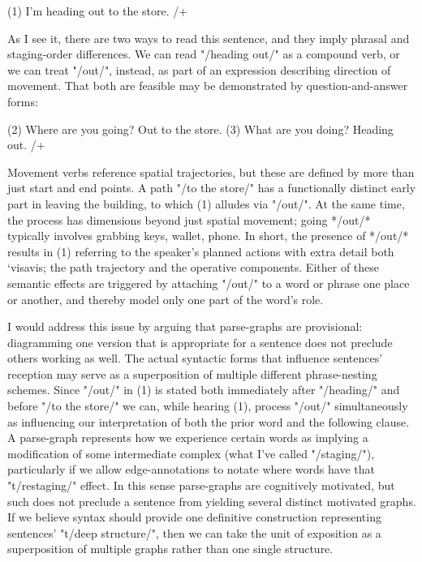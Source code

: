 (1)  I'm heading out to the store.
/+

As I see it, there are two ways to read this sentence, and they imply phrasal 
and staging-order differences.  We can read "/heading out/" as a compound 
verb, or we can treat "/out/", instead, as part of an expression describing 
direction of movement.  That both are feasible may be demonstrated by 
question-and-answer forms:

(2)  Where are you going?  Out to the store.
(3)  What are you doing?  Heading out.
/+

Movement verbs reference spatial trajectories, but these are 
defined by more than just start and end points.  A path 
"/to the store/" has a functionally distinct early part in leaving 
the building, to which (1) alludes via "/out/".  At the same time, 
the process has dimensions beyond just spatial movement; going 
*/out/* typically involves grabbing keys, wallet, phone.  
In short, the presence of */out/* results in (1) referring to 
the speaker's planned actions with extra detail both `visavis; the 
path trajectory and the operative components.  Either of these 
semantic effects are triggered by attaching "/out/" to a word 
or phrase %
one place or another, and thereby model only one part of the word's role.

I would address this issue by arguing that parse-graphs are provisional: 
diagramming one version that is appropriate for a sentence does not 
preclude others working as well.  The actual syntactic forms that 
influence sentences' reception may serve as a superposition 
of multiple different phrase-nesting schemes.  Since "/out/" 
in (1) is stated both immediately after "/heading/" and before 
"/to the store/" we can, while hearing (1), process "/out/" 
simultaneously as influencing our interpretation of both the 
prior word and the following clause.  A parse-graph represents 
how we experience certain words as implying a modification of 
some intermediate complex (what I've called "/staging/"), 
particularly if we allow edge-annotations to notate where 
words have that "t/restaging/" effect.  
In this sense parse-graphs are cognitively motivated, 
but such does not preclude a sentence from yielding several 
distinct motivated graphs.  If we believe syntax should 
provide one definitive construction representing sentences' 
"t/deep structure/", then we can take the unit of exposition 
as a superposition of multiple graphs rather 
than one single structure.

